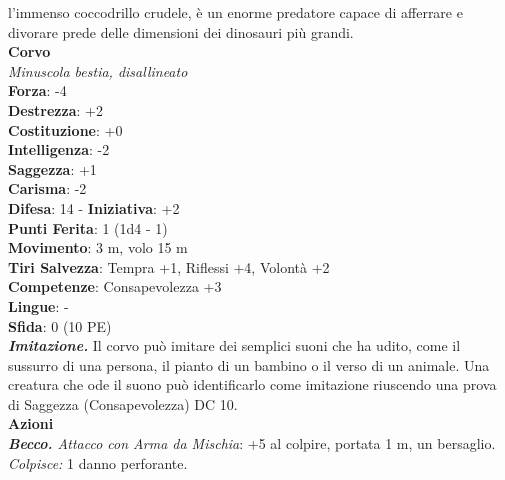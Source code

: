 \begin{multicols}{2}
l'immenso coccodrillo crudele, è un enorme predatore capace di afferrare e divorare prede delle dimensioni dei dinosauri più grandi. \\


\medskip\textbf{Corvo}\\
\emph{Minuscola bestia, disallineato}\\
\textbf{Forza}: -4\\
\textbf{Destrezza}: +2\\
\textbf{Costituzione}: +0\\
\textbf{Intelligenza}: -2\\
\textbf{Saggezza}: +1\\
\textbf{Carisma}: -2\\
\textbf{Difesa}: 14 - \textbf{Iniziativa}: +2\\
\textbf{Punti Ferita}: 1 (1d4 - 1)\\
\textbf{Movimento}: 3 m, volo 15 m\\
\textbf{Tiri Salvezza}: Tempra +1, Riflessi +4, Volontà +2 \\
\textbf{Competenze}: Consapevolezza +3\\
\textbf{Lingue}: -\\
\textbf{Sfida}: 0 (10 PE)\smallskip\\
\emph{\textbf{Imitazione.}} Il corvo può imitare dei semplici suoni che ha udito, come il sussurro di una persona, il pianto di un bambino o il verso di un animale. Una creatura che ode il suono può identificarlo come imitazione riuscendo una prova di Saggezza (Consapevolezza) DC 10.\\
\smallskip\textbf{Azioni}\\
\emph{\textbf{Becco.} Attacco con Arma da Mischia}: +5 al colpire, portata 1 m, un bersaglio.\\
\emph{Colpisce:} 1 danno perforante.\\



\end{multicols}
